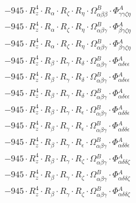 \documentclass{article}
\begin{document}
\begin{subequations}
\begin{gather}
\begin{array}{c}
 \\[0.2em] 		 - 945 \cdot R_{z}^{4} \cdot R_{\alpha{}} \cdot R_{\zeta{}} \cdot R_{\eta{}} \cdot \Omega{}^{B}_{\alpha{}\beta{}\beta{}} \cdot \Phi{}^{A}_{\gamma{}\gamma{}\zeta{}\eta{}} 
 \\[0.2em] 		 - 945 \cdot R_{z}^{4} \cdot R_{\alpha{}} \cdot R_{\zeta{}} \cdot R_{\eta{}} \cdot \Omega{}^{B}_{\alpha{}\beta{}\gamma{}} \cdot \Phi{}^{A}_{\beta{}\gamma{}\zeta{}\eta{}} 
 \\[0.2em] 		 - 945 \cdot R_{z}^{4} \cdot R_{\alpha{}} \cdot R_{\zeta{}} \cdot R_{\eta{}} \cdot \Omega{}^{B}_{\alpha{}\beta{}\gamma{}} \cdot \Phi{}^{A}_{\beta{}\gamma{}\zeta{}\eta{}} 
 \\[0.2em] 		 - 945 \cdot R_{z}^{4} \cdot R_{\beta{}} \cdot R_{\gamma{}} \cdot R_{\delta{}} \cdot \Omega{}^{B}_{\alpha{}\beta{}\gamma{}} \cdot \Phi{}^{A}_{\alpha{}\delta{}\epsilon{}\epsilon{}} 
 \\[0.2em] 		 - 945 \cdot R_{z}^{4} \cdot R_{\beta{}} \cdot R_{\gamma{}} \cdot R_{\delta{}} \cdot \Omega{}^{B}_{\alpha{}\beta{}\gamma{}} \cdot \Phi{}^{A}_{\alpha{}\delta{}\epsilon{}\epsilon{}} 
 \\[0.2em] 		 - 945 \cdot R_{z}^{4} \cdot R_{\beta{}} \cdot R_{\gamma{}} \cdot R_{\delta{}} \cdot \Omega{}^{B}_{\alpha{}\beta{}\gamma{}} \cdot \Phi{}^{A}_{\alpha{}\delta{}\epsilon{}\epsilon{}} 
 \\[0.2em] 		 - 945 \cdot R_{z}^{4} \cdot R_{\beta{}} \cdot R_{\gamma{}} \cdot R_{\epsilon{}} \cdot \Omega{}^{B}_{\alpha{}\beta{}\gamma{}} \cdot \Phi{}^{A}_{\alpha{}\delta{}\delta{}\epsilon{}} 
 \\[0.2em] 		 - 945 \cdot R_{z}^{4} \cdot R_{\beta{}} \cdot R_{\gamma{}} \cdot R_{\epsilon{}} \cdot \Omega{}^{B}_{\alpha{}\beta{}\gamma{}} \cdot \Phi{}^{A}_{\alpha{}\delta{}\delta{}\epsilon{}} 
 \\[0.2em] 		 - 945 \cdot R_{z}^{4} \cdot R_{\beta{}} \cdot R_{\gamma{}} \cdot R_{\epsilon{}} \cdot \Omega{}^{B}_{\alpha{}\beta{}\gamma{}} \cdot \Phi{}^{A}_{\alpha{}\delta{}\delta{}\epsilon{}} 
 \\[0.2em] 		 - 945 \cdot R_{z}^{4} \cdot R_{\beta{}} \cdot R_{\gamma{}} \cdot R_{\zeta{}} \cdot \Omega{}^{B}_{\alpha{}\beta{}\gamma{}} \cdot \Phi{}^{A}_{\alpha{}\delta{}\delta{}\zeta{}} 
 \\[0.2em] 		 - 945 \cdot R_{z}^{4} \cdot R_{\beta{}} \cdot R_{\gamma{}} \cdot R_{\zeta{}} \cdot \Omega{}^{B}_{\alpha{}\beta{}\gamma{}} \cdot \Phi{}^{A}_{\alpha{}\delta{}\delta{}\zeta{}} 
 \\[0.2em] 		 - 945 \cdot R_{z}^{4} \cdot R_{\beta{}} \cdot R_{\gamma{}} \cdot R_{\zeta{}} \cdot \Omega{}^{B}_{\alpha{}\beta{}\gamma{}} \cdot \Phi{}^{A}_{\alpha{}\delta{}\delta{}\zeta{}} 

\end{array}
\end{gather}
\end{subequations}
\end{document}
